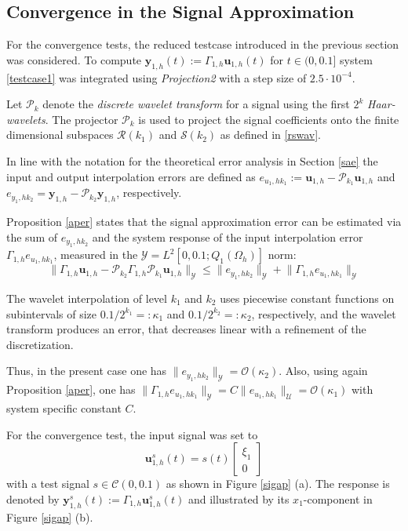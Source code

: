 \documentclass[a4paper,10pt,BCOR=15mm]{scrbook}
\providecommand{\norm}[1]{\lVert#1 \rVert}
\begin{document}
\subsection{Convergence in the Signal Approximation}

For the convergence tests, the reduced testcase introduced in the previous section was considered. To compute $\mathbf y_{1,h}(t) :=\Gamma _{1,h}\mathbf u_{1,h}(t)$ for $t\in(0,0.1]$ system \eqref{testcase1} was integrated using \textit{Projection2} with a step size of $2.5 \cdot 10^{-4}$.

Let $\mathscr P_k$ denote the \textit{discrete wavelet transform} for a signal using the first $2^k$ \textit{Haar-wavelets}. The projector $\mathscr P_k$ is used to project the signal coefficients onto the finite dimensional subspaces $\mathcal R(k_1)$ and $\mathcal S(k_2)$ as defined in \eqref{rswav}.

In line with the notation for the theoretical error analysis in Section \ref{sae} the input and output interpolation errors are defined as $e_{u_1,hk_1}:=\mathbf u_{1,h}-\mathscr P_{k_1}\mathbf u_{1,h}$ and $e_{y_1,hk_2}= \mathbf y_{1,h}-\mathscr P_{k_2}\mathbf y_{1,h}$, respectively.

Proposition \ref{aper} states that the signal approximation error can be estimated via the sum of $e_{y_1,hk_2}$ and the system response of the input interpolation error $\Gamma _{1,h}e_{u_1,hk_1}$, measured in the $\mathcal Y = L^2[0,0.1;Q_1(\Omega_h)]$ norm:
\begin{equation*}
 \norm{\Gamma _{1,h}\mathbf u_{1,h} - \mathscr P_{k_2}\Gamma _{1,h}\mathscr P_{k_1}\mathbf u_{1,h}}_{\mathcal Y} \leq \norm{e_{y_1,hk_2}}_{\mathcal Y} + \norm{\Gamma _{1,h}e_{u_1,hk_1}}_{\mathcal Y}
\end{equation*}


The wavelet interpolation of level $k_1$ and $k_2$ uses piecewise constant functions on subintervals of size $0.1/2^{k_1} =: \kappa_1$ and $0.1/2^{k_2} =: \kappa_2$, respectively, and the wavelet transform produces an error, that decreases linear with a refinement of the discretization. 

Thus, in the present case one has $\norm{e_{y_1,hk_2}}_{\mathcal Y}=\mathcal O(\kappa_2)$. Also, using again Proposition \ref{aper}, one has $\norm{\Gamma _{1,h}e_{u_1,hk_1}}_{\mathcal Y}=C\norm{e_{u_1,hk_1}}_{\mathcal U}=\mathcal O(\kappa_1)$ with system specific constant $C$.

For the convergence test, the input signal was set to
\begin{equation*}
 \mathbf u^s_{1,h}(t) = s(t)\begin{bmatrix} \xi_1 \\ 0 \end{bmatrix}
\end{equation*}
with a test signal $s \in \mathcal C(0,0.1)$ as shown in Figure \ref{sigap} (a). The response is denoted by $\mathbf y^s_{1,h}(t) :=\Gamma _{1,h}\mathbf u^s_{1,h}(t)$ and illustrated by its $x_1$-component in Figure \ref{sigap} (b).
\end{document}
